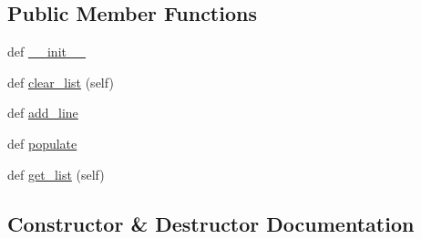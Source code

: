 \subsection*{Public Member Functions}
\begin{DoxyCompactItemize}
\item 
def \hyperlink{class_uni_dec_1_1unidec__modules_1_1_i_m__windows_1_1_i_m_list_ctrl_ab01601cdcb09ae6c49df12c049d0c319}{\+\_\+\+\_\+init\+\_\+\+\_\+}
\item 
def \hyperlink{class_uni_dec_1_1unidec__modules_1_1_i_m__windows_1_1_i_m_list_ctrl_aeac296d3be4fb2cab3d863d7eb7562dd}{clear\+\_\+list} (self)
\item 
def \hyperlink{class_uni_dec_1_1unidec__modules_1_1_i_m__windows_1_1_i_m_list_ctrl_ab32fc4c1397a64def70986346ccb0d77}{add\+\_\+line}
\item 
def \hyperlink{class_uni_dec_1_1unidec__modules_1_1_i_m__windows_1_1_i_m_list_ctrl_a218ad2430a4bee3c27396cefd5fa2bbe}{populate}
\item 
def \hyperlink{class_uni_dec_1_1unidec__modules_1_1_i_m__windows_1_1_i_m_list_ctrl_aa6eb6adce5c8e3c314117fc898c4889f}{get\+\_\+list} (self)
\end{DoxyCompactItemize}


\subsection{Constructor \& Destructor Documentation}
\hypertarget{class_uni_dec_1_1unidec__modules_1_1_i_m__windows_1_1_i_m_list_ctrl_ab01601cdcb09ae6c49df12c049d0c319}{}
